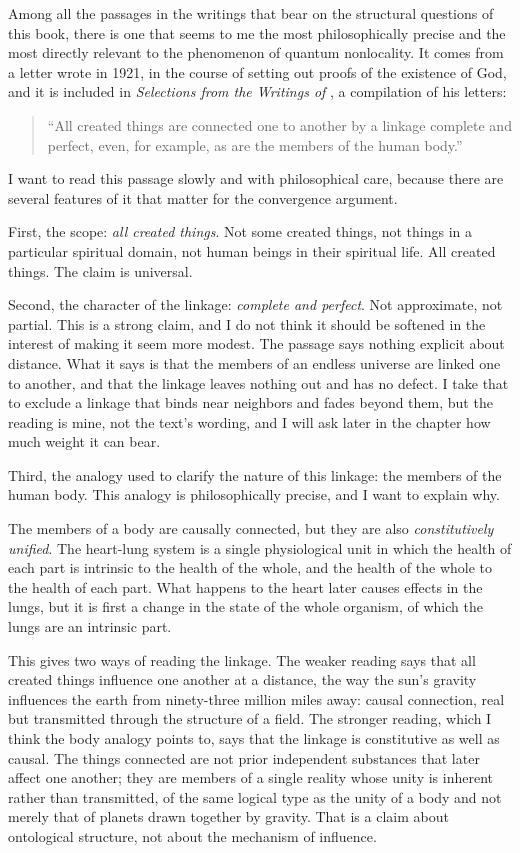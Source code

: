 Among all the passages in the \bahai writings that bear on the structural questions of this book, there is one that seems to me the most philosophically precise and the most directly relevant to the phenomenon of quantum nonlocality. It comes from a letter \AbdulBaha wrote in 1921, in the course of setting out proofs of the existence of God, and it is included in \emph{Selections from the Writings of \AbdulBaha}, a compilation of his letters:

\begin{quote}
``All created things are connected one to another by a linkage complete and perfect, even, for example, as are the members of the human body.''
\citep[\S 21]{SelectionsAbdul}
\end{quote}

I want to read this passage slowly and with philosophical care, because there are several features of it that matter for the convergence argument.

First, the scope: \emph{all created things}. Not some created things, not things in a particular spiritual domain, not human beings in their spiritual life. All created things. The claim is universal.

Second, the character of the linkage: \emph{complete and perfect}. Not approximate, not partial. This is a strong claim, and I do not think it should be softened in the interest of making it seem more modest. The passage says nothing explicit about distance. What it says is that the members of an endless universe are linked one to another, and that the linkage leaves nothing out and has no defect. I take that to exclude a linkage that binds near neighbors and fades beyond them, but the reading is mine, not the text's wording, and I will ask later in the chapter how much weight it can bear.

Third, the analogy used to clarify the nature of this linkage: the members of the human body. This analogy is philosophically precise, and I want to explain why.

The members of a body are causally connected, but they are also \emph{constitutively unified}. The heart-lung system is a single physiological unit in which the health of each part is intrinsic to the health of the whole, and the health of the whole to the health of each part. What happens to the heart later causes effects in the lungs, but it is first a change in the state of the whole organism, of which the lungs are an intrinsic part.

This gives two ways of reading the linkage. The weaker reading says that all created things influence one another at a distance, the way the sun's gravity influences the earth from ninety-three million miles away: causal connection, real but transmitted through the structure of a field. The stronger reading, which I think the body analogy points to, says that the linkage is constitutive as well as causal. The things connected are not prior independent substances that later affect one another; they are members of a single reality whose unity is inherent rather than transmitted, of the same logical type as the unity of a body and not merely that of planets drawn together by gravity. That is a claim about ontological structure, not about the mechanism of influence.

